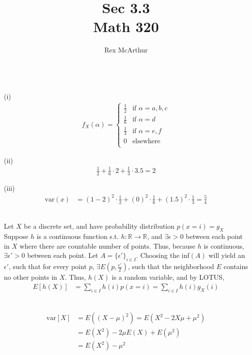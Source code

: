 \documentclass[letterpaper,12pt]{article}
\title{Sec 3.3 \\Math 320}
\author{Rex McArthur}
\theoremstyle{definition}
\begin{document}
\maketitle
{}\\
(i)\\
\begin{align*}
    f_X(\alpha) = \begin{cases} \frac{1}{2} &\mbox{if } \alpha = a,b,c\\
        \frac{1}{6} & \mbox{if } \alpha = d \\
        \frac{1}{3} & \mbox{if } \alpha = e,f \\
        0 & \mbox{elsewhere }\\
    \end{cases}
\end{align*}

(ii)\\
\begin{align*}
    \frac{1}{2} + \frac{1}{6}\cdot 2 + \frac{1}{3} \cdot 3.5 = 2
\end{align*}

(iii)\\
\begin{align*}
    \text{var}(x) &= (1-2)^2 \cdot \frac{1}{2} + (0)^2 \cdot \frac{1}{6} + (1.5)^2 \cdot \frac{1}{3} = \frac{5}{4}
\end{align*}

\\
Let $X$ be a discrete set, and have probability distribution $p(x=i) = g_X$
Suppose $h$ is a continuous function s.t. $h:\mathbb{R} \rightarrow \mathbb{R}$, and $\exists \epsilon > 0$ between each point in $X$ where there are countable number of points.
Thus, because $h$ is continuous, $\exists \epsilon' >0$ between each point. Let $A = \{\epsilon '\}_{i\in I}$.
Choosing the inf$(A)$ will yield an $\epsilon'$, such that for every point $p$, 
$\exists E(p,\frac{\epsilon'}{2})$, such that the neighborhood $E$ contains no other points in $X$. Thus, $h(X)$ is a random variable, and by LOTUS,
\begin{align*}
    E[h(X)] &= \sum_{i \in I}h(i)p(x = i) = \sum_{i \in I} h(i)g_X(i)
\end{align*}

\\
\begin{align*}
    \text{var}[X] & = E((X-\mu)^2) = E(X^2 - 2X\mu + \mu^2) \\
    & = E(X^2) - 2\mu E(X) + E(\mu^2)\\
    & = E(X^2) - \mu^2
\end{align*}
\end{document}
